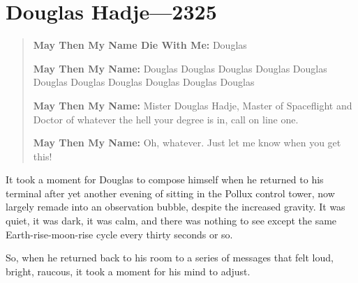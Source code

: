 \hypertarget{douglas-hadje-2325}{%
\chapter{Douglas Hadje---2325}\label{douglas-hadje-2325}}

\begin{quote}
\textbf{May Then My Name Die With Me:} Douglas

\textbf{May Then My Name:} Douglas Douglas Douglas Douglas Douglas Douglas Douglas Douglas Douglas Douglas Douglas

\textbf{May Then My Name:} Mister Douglas Hadje, Master of Spaceflight and Doctor of whatever the hell your degree is in, call on line one.

\textbf{May Then My Name:} Oh, whatever. Just let me know when you get this!
\end{quote}

\noindent It took a moment for Douglas to compose himself when he returned to his terminal after yet another evening of sitting in the Pollux control tower, now largely remade into an observation bubble, despite the increased gravity. It was quiet, it was dark, it was calm, and there was nothing to see except the same Earth-rise-moon-rise cycle every thirty seconds or so.

So, when he returned back to his room to a series of messages that felt loud, bright, raucous, it took a moment for his mind to adjust.


